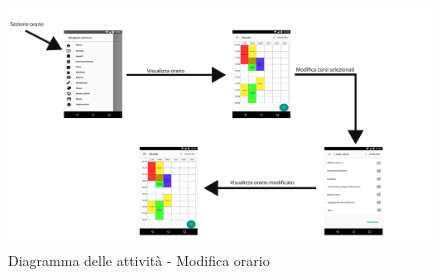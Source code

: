 \begin{figure}
	\centering
	\includegraphics[width=\textwidth]{imgs/gruppo2/activity-orario-modifica-orario}
	\caption{Diagramma delle attività - Modifica orario}
	\label{fig:act-diag-orario-modifica-orario}
\end{figure}

\clearpage